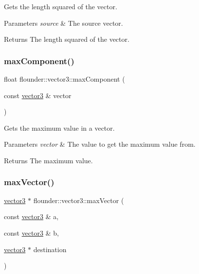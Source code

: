 Gets the length squared of the vector. 


\begin{DoxyParams}{Parameters}
{\em source} & The source vector. \\
\hline
\end{DoxyParams}
\begin{DoxyReturn}{Returns}
The length squared of the vector. 
\end{DoxyReturn}
\mbox{\label{classflounder_1_1vector3_a221b510b47bcb1a44214ad2ceea95c01}} 
\subsubsection{\texorpdfstring{max\+Component()}{maxComponent()}}
{\footnotesize\ttfamily float flounder\+::vector3\+::max\+Component (\begin{DoxyParamCaption}\item[{const \hyperlink{classflounder_1_1vector3}{vector3} \&}]{vector }\end{DoxyParamCaption})\hspace{0.3cm}{\ttfamily [static]}}



Gets the maximum value in a vector. 


\begin{DoxyParams}{Parameters}
{\em vector} & The value to get the maximum value from. \\
\hline
\end{DoxyParams}
\begin{DoxyReturn}{Returns}
The maximum value. 
\end{DoxyReturn}
\mbox{\label{classflounder_1_1vector3_a0230a6d65edfe89a165e51030dc6545b}} 
\subsubsection{\texorpdfstring{max\+Vector()}{maxVector()}}
{\footnotesize\ttfamily \hyperlink{classflounder_1_1vector3}{vector3} $\ast$ flounder\+::vector3\+::max\+Vector (\begin{DoxyParamCaption}\item[{const \hyperlink{classflounder_1_1vector3}{vector3} \&}]{a,  }\item[{const \hyperlink{classflounder_1_1vector3}{vector3} \&}]{b,  }\item[{\hyperlink{classflounder_1_1vector3}{vector3} $\ast$}]{destination }\end{DoxyParamCaption})\hspace{0.3cm}{\ttfamily [static]}}



